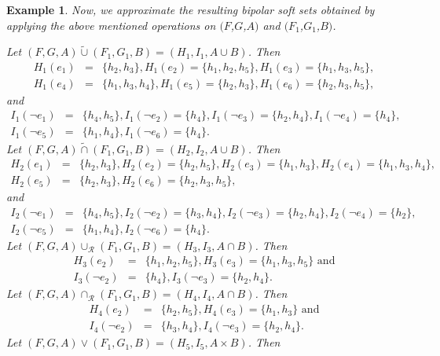 \documentclass{amsart}
\theoremstyle{plain}
\newtheorem{example}{Example}
\numberwithin{equation}{section}
\begin{document}
\begin{example}
Now, we approximate the resulting bipolar soft sets obtained by applying the
above mentioned operations on $(F$,$G$,$A)$ and $(F_{1}$,$G_{1}$,$B)$.

Let $(F,G,A)\tilde{\cup}(F_{1},G_{1},B)=(H_{1},I_{1},A\cup B)$. Then\begin{eqnarray*}
H_{1}(e_{1})
&=&\{h_{2},h_{3}\},H_{1}(e_{2})=\{h_{1},h_{2},h_{5}\},H_{1}(e_{3})=\{h_{1},h_{3},h_{5}\}, \\
H_{1}(e_{4})
&=&\{h_{1},h_{3},h_{4}\},H_{1}(e_{5})=\{h_{2},h_{3}\},H_{1}(e_{6})=\{h_{2},h_{3},h_{5}\},
\end{eqnarray*}and\begin{eqnarray*}
I_{1}(\lnot e_{1}) &=&\{h_{4},h_{5}\},I_{1}(\lnot
e_{2})=\{h_{4}\},I_{1}(\lnot e_{3})=\{h_{2},h_{4}\},I_{1}(\lnot
e_{4})=\{h_{4}\}, \\
I_{1}(\lnot e_{5}) &=&\{h_{1},h_{4}\},I_{1}(\lnot e_{6})=\{h_{4}\}.
\end{eqnarray*}Let $(F,G,A)\tilde{\cap}(F_{1},G_{1},B)=(H_{2},I_{2},A\cup B)$. Then\begin{eqnarray*}
H_{2}(e_{1})
&=&\{h_{2},h_{3}\},H_{2}(e_{2})=\{h_{2},h_{5}\},H_{2}(e_{3})=\{h_{1},h_{3}\},H_{2}(e_{4})=\{h_{1},h_{3},h_{4}\}, \\
H_{2}(e_{5}) &=&\{h_{2},h_{3}\},H_{2}(e_{6})=\{h_{2},h_{3},h_{5}\},
\end{eqnarray*}and\begin{eqnarray*}
I_{2}(\lnot e_{1}) &=&\{h_{4},h_{5}\},I_{2}(\lnot
e_{2})=\{h_{3},h_{4}\},I_{2}(\lnot e_{3})=\{h_{2},h_{4}\},I_{2}(\lnot
e_{4})=\{h_{2}\}, \\
I_{2}(\lnot e_{5}) &=&\{h_{1},h_{4}\},I_{2}(\lnot e_{6})=\{h_{4}\}.
\end{eqnarray*}Let $(F,G,A)\cup _{\mathcal{R}}(F_{1},G_{1},B)=(H_{3},I_{3},A\cap B)$. Then\begin{eqnarray*}
H_{3}(e_{2}) &=&\{h_{1},h_{2},h_{5}\},H_{3}(e_{3})=\{h_{1},h_{3},h_{5}\}\text{ \ \ \ and} \\
I_{3}(\lnot e_{2}) &=&\{h_{4}\},I_{3}(\lnot e_{3})=\{h_{2},h_{4}\}.
\end{eqnarray*}Let $(F,G,A)\cap _{\mathcal{R}}(F_{1},G_{1},B)=(H_{4},I_{4},A\cap B)$. Then\begin{eqnarray*}
H_{4}(e_{2}) &=&\{h_{2},h_{5}\},H_{4}(e_{3})=\{h_{1},h_{3}\}\text{ \ and} \\
I_{4}(\lnot e_{2}) &=&\{h_{3},h_{4}\},I_{4}(\lnot e_{3})=\{h_{2},h_{4}\}.
\end{eqnarray*}Let $(F,G,A)\vee (F_{1},G_{1},B)=(H_{5},I_{5},A\times B)$. Then\begin{eqnarray*}

\end{eqnarray*}
\end{example}
\end{document}
